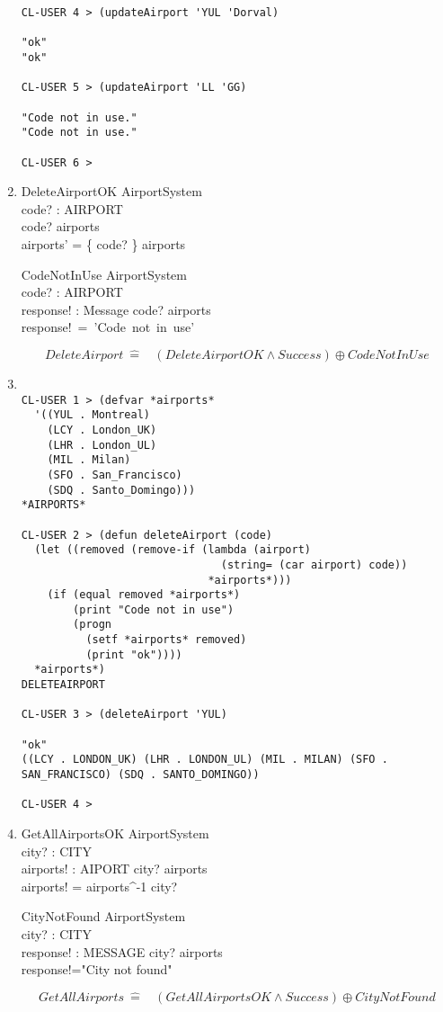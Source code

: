 \documentclass[12pt]{article}
\begin{document}
\begin{enumerate}
\begin{verbatim}
CL-USER 4 > (updateAirport 'YUL 'Dorval)

"ok" 
"ok"

CL-USER 5 > (updateAirport 'LL 'GG)

"Code not in use." 
"Code not in use."

CL-USER 6 > 
\end{verbatim}
\item
\begin{schema}{DeleteAirportOK}
\Delta AirportSystem\\
code? : AIRPORT\\
\where
code? \in \dom airports\\
airports' = \{ code? \}  \ndres airports \\
\end{schema}
\begin{schema}{CodeNotInUse}
\Xi AirportSystem\\
code? : AIRPORT\\
response! : Message
\ST
code? \notin \dom airports\\
response!~=~'Code~not~in~use'
\end{schema}
\[ DeleteAirport~\hat{=}~~~~(DeleteAirportOK\wedge Success) \oplus CodeNotInUse\]
\item
\begin{verbatim}

CL-USER 1 > (defvar *airports*
  '((YUL . Montreal)
    (LCY . London_UK)
    (LHR . London_UL)
    (MIL . Milan)
    (SFO . San_Francisco)
    (SDQ . Santo_Domingo)))
*AIRPORTS*

CL-USER 2 > (defun deleteAirport (code)
  (let ((removed (remove-if (lambda (airport)
                               (string= (car airport) code))
                             *airports*)))
    (if (equal removed *airports*)
        (print "Code not in use")
        (progn
          (setf *airports* removed)
          (print "ok"))))
  *airports*)
DELETEAIRPORT

CL-USER 3 > (deleteAirport 'YUL)

"ok" 
((LCY . LONDON_UK) (LHR . LONDON_UL) (MIL . MILAN) (SFO . SAN_FRANCISCO) (SDQ . SANTO_DOMINGO))

CL-USER 4 > 
\end{verbatim}
\item
\begin{schema}{GetAllAirportsOK}
\Xi AirportSystem\\
city? : CITY\\
airports! :  AIPORT
\where
city? \in \ran airports\\
airports! = airports^{-1} city?
\end{schema}
\begin{schema}{CityNotFound}
\Xi AirportSystem\\
city? : CITY\\
response! : MESSAGE
\where
city? \notin \ran airports\\
response!="City not found"
\end{schema}
\[ GetAllAirports~\hat{=}~~~~(GetAllAirportsOK\wedge Success) \oplus CityNotFound\]


\end{enumerate}
\end{document}
